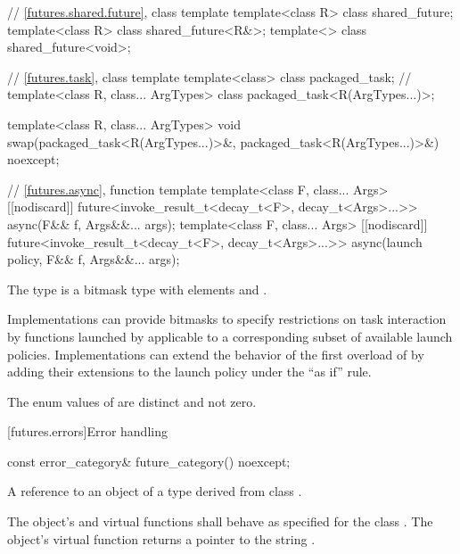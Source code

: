\begin{codeblock}
{  // \ref{futures.shared.future}, class template 
  template<class R> class shared_future;
  template<class R> class shared_future<R&>;
  template<> class shared_future<void>;

  // \ref{futures.task}, class template 
  template<class> class packaged_task;  // \notdef
  template<class R, class... ArgTypes>
    class packaged_task<R(ArgTypes...)>;

  template<class R, class... ArgTypes>
    void swap(packaged_task<R(ArgTypes...)>&, packaged_task<R(ArgTypes...)>&) noexcept;

  // \ref{futures.async}, function template 
  template<class F, class... Args>
    [[nodiscard]] future<invoke_result_t<decay_t<F>, decay_t<Args>...>>
      async(F&& f, Args&&... args);
  template<class F, class... Args>
    [[nodiscard]] future<invoke_result_t<decay_t<F>, decay_t<Args>...>>
      async(launch policy, F&& f, Args&&... args);
}
\end{codeblock}

\pnum
The  type  is a bitmask type with
elements  and .
\begin{note}
Implementations can provide bitmasks to specify restrictions on task
interaction by functions launched by  applicable to a
corresponding subset of available launch policies. Implementations can extend
the behavior of the first overload of  by adding their extensions
to the launch policy under the ``as if'' rule.
\end{note}

\pnum
The enum values of  are distinct and not zero.

[futures.errors]{Error handling}

%
\begin{itemdecl}
const error_category& future_category() noexcept;
\end{itemdecl}

\begin{itemdescr}
\pnum
\returns
A reference to an object of a type derived from class .

\pnum
The object's  and  virtual functions shall
behave as specified for the class . The object's 
virtual function returns a pointer to the string .
\end{itemdescr}

